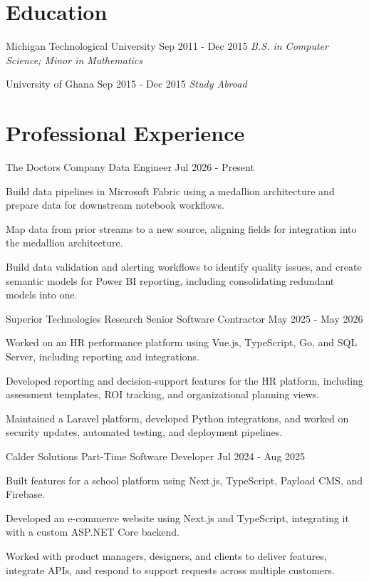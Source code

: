 \documentclass{../styles/cv}
\begin{document}
\populatedtitle

\section{Education}
\subsectiondate
    {Michigan Technological University}
    {Sep 2011 - Dec 2015}
\textit{B.S. in Computer Science; Minor in Mathematics}

\subsectiondate
    {University of Ghana}
    {Sep 2015 - Dec 2015}
\textit{Study Abroad}

\section{Professional Experience}

\subsectionpositiondate
    {The Doctors Company}
    {Data Engineer}
    {Jul 2026 - Present}
\resumesublistbegin
    \item Build data pipelines in Microsoft Fabric using a medallion architecture and prepare data for downstream notebook workflows.
    \item Map data from prior streams to a new source, aligning fields for integration into the medallion architecture.
    \item Build data validation and alerting workflows to identify quality issues, and create semantic models for Power BI reporting, including consolidating redundant models into one.
\resumesublistend

\subsectionpositiondate
    {Superior Technologies Research}
    {Senior Software Contractor}
    {May 2025 - May 2026}
\resumesublistbegin
    \item Worked on an HR performance platform using Vue.js, TypeScript, Go, and SQL Server, including reporting and integrations.
    \item Developed reporting and decision-support features for the HR platform, including assessment templates, ROI tracking, and organizational planning views.
    \item Maintained a Laravel platform, developed Python integrations, and worked on security updates, automated testing, and deployment pipelines.
\resumesublistend

\subsectionpositiondate
    {Calder Solutions}
    {Part-Time Software Developer}
    {Jul 2024 - Aug 2025}
\resumesublistbegin
    \item Built features for a school platform using Next.js, TypeScript, Payload CMS, and Firebase.
    \item Developed an e-commerce website using Next.js and TypeScript, integrating it with a custom ASP.NET Core backend.
    \item Worked with product managers, designers, and clients to deliver features, integrate APIs, and respond to support requests across multiple customers.
\resumesublistend
\end{document}
